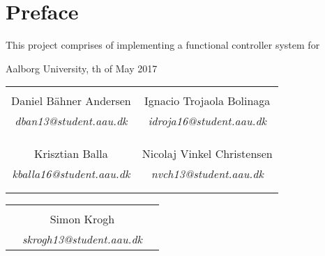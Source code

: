\chapter*{Preface}

This project comprises of implementing a functional controller system for 

\hfill Aalborg University, th of May 2017




\vfill

\begin{table}[H]
	\centering
		\begin{tabular}{c c }
			\underline{\phantom{mmmmmmmmmmmmmmmmmmm}}       & \underline{\phantom{mmmmmmmmmmmmmmmmmmm}} \\
			Daniel Bähner Andersen			 & Ignacio Trojaola Bolinaga  \\
			\textit{dban13@student.aau.dk} & \textit{idroja16@student.aau.dk}\\
			&\\
			&\\
			\underline{\phantom{mmmmmmmmmmmmmmmmmmm}}       & \underline{\phantom{mmmmmmmmmmmmmmmmmmm}} \\
			Krisztian Balla			 & Nicolaj Vinkel Christensen \\
			\textit{kballa16@student.aau.dk} & \textit{nvch13@student.aau.dk} \\
			&\\
			&\\	
		\end{tabular}
		\begin{tabular}{c c c}
			& \underline{\phantom{mmmmmmmmmmmmmmmmmmm}} 	& \\
			& Simon Krogh					& \\
			& \textit{skrogh13@student.aau.dk}		& \\
		\end{tabular}
\end{table}